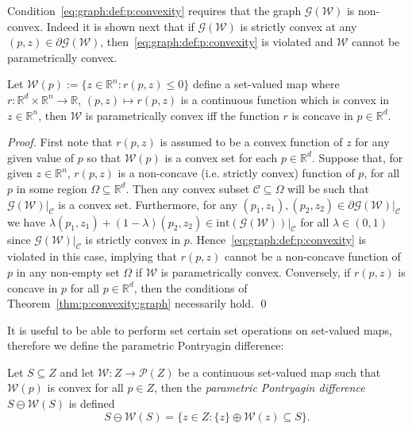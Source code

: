 \documentclass[smallextended]{svjour3}       %
\numberwithin{equation}{section}
\begin{document}
Condition~\eqref{eq:graph:def:p:convexity} requires that the graph $\mathscr G(\mathcal W)$ is non-convex.
%
Indeed it is shown next that if $\mathscr G(\mathcal W)$ is strictly convex at any $(p,z)\in\partial \mathscr G (\mathcal W)$, then~\eqref{eq:graph:def:p:convexity} is violated and 
$\mathcal W$ cannot be parametrically convex.

%
\begin{corollary}\label{thm:inequalities:convex:concave}
%
Let $\mathcal W(p):=\{z\in\mathbb R^n: r(p,z)\leq0\}$ define a set-valued
map where 
$r: \mathbb R^d \times\mathbb R^n \rightarrow \mathbb R$, $(p,z)\mapsto r(p,z)$ is a continuous function which is convex in $z \in\mathbb R^n$, 
then $\mathcal W$ is parametrically
convex iff the function $r$ is concave in $p\in\mathbb R^d$.
%
\end{corollary}
%
\begin{proof}
First note that $r(p,z)$ is assumed to be a convex function of $z$ for any given value of $p$ so that $\mathcal W(p)$ is a convex set for each $p\in\mathbb R^d$.
%
Suppose that, for given $z\in\mathbb R^n$, $r(p,z)$ is a non-concave (i.e. 
strictly convex) function of $p$, for all $p$ in some region $\Omega\subseteq\mathbb R^d$. 
%
Then any convex subset $\mathcal C\subseteq\Omega$ will be such that $\mathscr 
G(\mathcal W)\vert_{\mathcal C}$ is a convex set.
%
Furthermore, for any $(p_1,z_1),(p_2,z_2)\in \partial\mathscr G(\mathcal W)\vert_{\mathcal C}$ we have
$\lambda (p_1,z_1) + (1-\lambda) (p_2,z_2) \in\mathrm{int} (\mathscr G(\mathcal W))\vert_{\mathcal C}$ for all $\lambda\in(0,1)$ since
$\mathscr G(\mathcal W)\vert_{\mathcal C}$ is strictly convex in $p$.
%
Hence~\eqref{eq:graph:def:p:convexity} is violated in this case, implying that $r(p,z)$ cannot be a non-concave function of $p$ in any non-empty set $\Omega$ if $\mathcal W$ is parametrically convex. 
%
Conversely, if $r(p,z)$ is concave in $p$ for all $p\in\mathbb R^d$, then the conditions of Theorem~\ref{thm:p:convexity:graph} necessarily hold.
\qed
\end{proof}
%
It is useful to be able to perform set certain set operations on set-valued maps, therefore we define the parametric Pontryagin difference:
%
\begin{definition}\label{def:parametric:pontryagin:difference}
  Let $S\subseteq Z$ and let $\mathcal W:Z\to\mathscr P(Z)$ be a continuous set-valued map such that
  $\mathcal W(p)$ is convex for all $p\in Z$, then the \emph{parametric Pontryagin difference} 
  $S\ominus \mathcal W(S)$ is defined
%
\begin{equation}\label{eq:definition:parametric:pontryagin:difference}
    S\ominus \mathcal W(S) = \bigl\{z\in Z: \{z\} \oplus \mathcal W(z)\subseteq S\bigr\}.
  \end{equation}
%
\end{definition}
\end{document}
